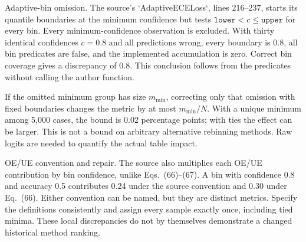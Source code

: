 \documentclass[10pt]{article}
\begin{document}
Adaptive-bin omission. The source’s `AdaptiveECELoss`, lines 216–237, starts its quantile boundaries at the minimum confidence but tests \(\texttt{lower}<c\leq\texttt{upper}\) for every bin. Every minimum-confidence observation is excluded. With thirty identical confidences \(c=0.8\) and all predictions wrong, every boundary is 0.8, all bin predicates are false, and the implemented accumulation is zero. Correct bin coverage gives a discrepancy of 0.8. This conclusion follows from the predicates without calling the author function.\par
If the omitted minimum group has size \(m_{\min}\), correcting only that omission with fixed boundaries changes the metric by at most \(m_{\min}/N\). With a unique minimum among 5,000 cases, the bound is 0.02 percentage points; with ties the effect can be larger. This is not a bound on arbitrary alternative rebinning methods. Raw logits are needed to quantify the actual table impact.\par
OE/UE convention and repair. The source also multiplies each OE/UE contribution by bin confidence, unlike Eqs. (66)–(67). A bin with confidence 0.8 and accuracy 0.5 contributes 0.24 under the source convention and 0.30 under Eq. (66). Either convention can be named, but they are distinct metrics. Specify the definitions consistently and assign every sample exactly once, including tied minima. These local discrepancies do not by themselves demonstrate a changed historical method ranking.\par
\end{document}
